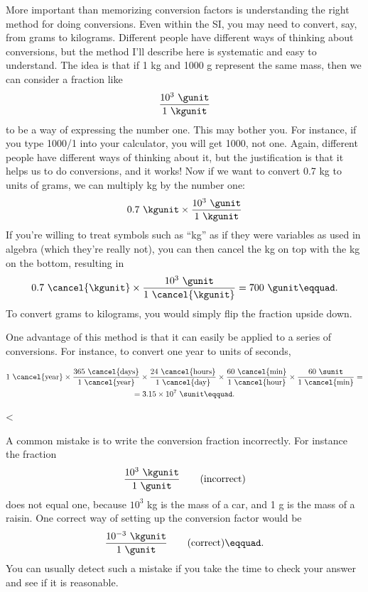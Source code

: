More important than memorizing conversion factors is
understanding the right method for doing conversions. Even
within the SI, you may need to convert, say, from grams to
kilograms. Different people have different ways of thinking
about conversions, but the method I'll describe here is
systematic and easy to understand. The idea is that if 1 kg
and 1000 g represent the same mass, then we can consider a fraction like
\begin{equation*}
  \frac{10^3\ \gunit}{1\ \kgunit}
\end{equation*}
to be a way of expressing the number one. This may bother
you. For instance, if you type 1000/1 into your calculator,
you will get 1000, not one. Again, different people have
different ways of thinking about it, but the justification
is that it helps us to do conversions, and it works! Now if
we want to convert 0.7 kg to units of grams, we can multiply
kg by the number one:
\begin{equation*}
  0.7\ \kgunit \times \frac{10^3\ \gunit}{1\ \kgunit}
\end{equation*}
If you're willing to treat symbols such as ``kg'' as if they
were variables as used in algebra (which they're really
not), you can then cancel the kg on top with the kg on the
bottom, resulting in
\begin{equation*}
  0.7\ \cancel{\kgunit} \times \frac{10^3\ \gunit}{1\ \cancel{\kgunit}}  = 700\ \gunit\eqquad.
\end{equation*}
To convert grams to kilograms, you would simply flip the
fraction upside down.

One advantage of this method is that it can easily be
applied to a series of conversions. For instance, to convert
one year to units of seconds,

\begin{multline*}
1\ \cancel{\text{year}} \times
\frac{365\ \cancel{\text{days}}}{1\ \cancel{\text{year}}} \times
\frac{24\ \cancel{\text{hours}}}{1\ \cancel{\text{day}}} \times
\frac{60\ \cancel{\text{min}}}{1\ \cancel{\text{hour}}} \times
\frac{60\ \sunit}{1\ \cancel{\text{min}}} = \\
= 3.15 \times 10^7\ \sunit\eqquad.
\end{multline*}

<%

A common mistake is to write the conversion fraction
incorrectly. For instance the fraction
\begin{equation*}
  \frac{10^3\ \kgunit}{1\ \gunit} \qquad \text{(incorrect)}
\end{equation*}
does not equal one, because $10^3$  kg is the mass of a car,
and 1 g is the mass of a raisin. One correct way of
setting up the conversion factor would be
\begin{equation*}
  \frac{10^{-3}\ \kgunit}{1\ \gunit} \qquad \text{(correct)}\eqquad.
\end{equation*}
You can usually detect such a mistake if you take the time
to check your answer and see if it is reasonable.

